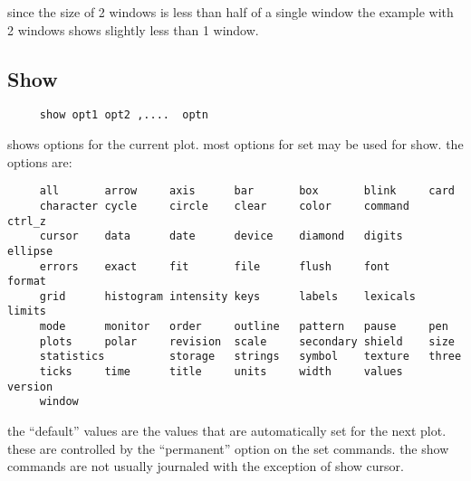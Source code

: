 since  the size of 2 windows is less than half of a single window the
example with 2 windows shows slightly less than 1 window.  
\subsection{Show}
\begin{verbatim}
     show opt1 opt2 ,....  optn 
\end{verbatim}
shows options for the current plot.  most options for set may be used for
show.  the options are:  
\begin{verbatim}
     all       arrow     axis      bar       box       blink     card
     character cycle     circle    clear     color     command   ctrl_z
     cursor    data      date      device    diamond   digits    ellipse
     errors    exact     fit       file      flush     font      format 
     grid      histogram intensity keys      labels    lexicals  limits 
     mode      monitor   order     outline   pattern   pause     pen
     plots     polar     revision  scale     secondary shield    size
     statistics          storage   strings   symbol    texture   three
     ticks     time      title     units     width     values    version
     window 
\end{verbatim}
the  ``default''  values  are the values that are automatically set for the
next plot.  these are controlled by the ``permanent''  option  on  the  set
commands.  the show commands are not usually journaled with the exception
of show cursor.  
